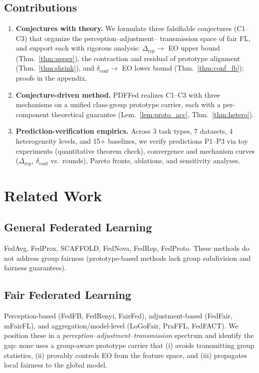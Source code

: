 \documentclass{article}
\newcommand{\rep}{\Delta_{\mathrm{rep}}}
\begin{document}
\subsection{Contributions}
\begin{enumerate}
  \item \textbf{Conjectures with theory.} We formulate three falsifiable
        conjectures (C1--C3) that organize the perception--adjustment--
        transmission space of fair FL, and support each with rigorous
        analysis: $\rep \to$ EO upper bound (Thm.~\ref{thm:upper}), the
        contraction and residual of prototype alignment
        (Thm.~\ref{thm:shrink}), and $\delta_{\mathrm{conf}} \to$ EO lower
        bound (Thm.~\ref{thm:conf_lb}); proofs in the appendix.
  \item \textbf{Conjecture-driven method.} PDFFed realizes C1--C3 with three
        mechanisms on a unified class-group prototype carrier, each with a
        per-component theoretical guarantee (Lem.~\ref{lem:proto_acc},
        Thm.~\ref{thm:hetero}).
  \item \textbf{Prediction-verification empirics.} Across 3 task types, 7
        datasets, 4 heterogeneity levels, and 15+ baselines, we verify
        predictions P1--P3 via toy experiments (quantitative theorem check),
        convergence and mechanism curves ($\rep$, $\delta_{\mathrm{conf}}$
        vs.\ rounds), Pareto fronts, ablations, and sensitivity analyses.
\end{enumerate}

\section{Related Work}
\subsection{General Federated Learning}
FedAvg, FedProx, SCAFFOLD, FedNova, FedRep, FedProto. These methods do not
address group fairness (prototype-based methods lack group subdivision and
fairness guarantees).

\subsection{Fair Federated Learning}
Perception-based (FedFB, FedRenyi, FairFed), adjustment-based (FedFair,
mFairFL), and aggregation/model-level (LoGoFair, PraFFL, FedFACT). We
position these in a \emph{perception--adjustment--transmission} spectrum and
identify the gap: none uses a group-aware prototype carrier that (i) avoids
transmitting group statistics, (ii) provably controls EO from the feature
space, and (iii) propagates local fairness to the global model.
\end{document}
